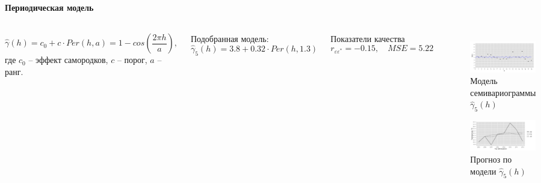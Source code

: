 \documentclass[10pt,pdf,aspectratio=169,hyperref={unicode},notheorems]{beamer}
\theoremstyle{definition}
\theoremstyle{example}
\theoremstyle{plain}
\begin{document}
\begin{frame}
  \frametitle{\large\subsecname}
  \framesubtitle{Периодическая модель}
  \begin{columns}[c]
  \column{3in}
  \begin{equation*}
    \widehat{\gamma}(h) = c_0 + c \cdot Per(h, a) = 1 - cos(\frac{2 \pi h}{a}),
  \end{equation*}
  где $ c_0 $ -- эффект самородков, $ c $ -- порог, $ a $ -- ранг.

  \vspace{0.5em}

  Подобранная модель:
  \begin{equation}
  \label{eq:gamma10}
    \widehat{\gamma}_5(h) = 3.8 + 0.32 \cdot Per(h, 1.3)
  \end{equation}

  Показатели качества
  \begin{equation*}
    r_{\varepsilon\varepsilon^{*}} = -0.15, \quad MSE = 5.22
  \end{equation*}

  \column{3in}
  \vspace{-14.5pt}
  \begin{figure}[H]
    \includegraphics[width=0.9\linewidth]{../../figures/variogram/auto-class-18-modeled.png} \\
    \caption{Модель семивариограммы $\widehat{\gamma}_5(h)$}
    \includegraphics[width=0.9\linewidth]{../../figures/variogram/auto-class-18-cross-prediction.png}
    \caption{Прогноз по модели $\widehat{\gamma}_5(h)$}
  \end{figure}
  \end{columns}
\end{frame}
\end{document}
